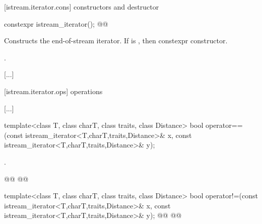 [istream.iterator.cons]{ constructors and destructor}

%
\begin{itemdecl}
constexpr istream_iterator();
@@
\end{itemdecl}

\begin{itemdescr}
\pnum
\effects
Constructs the end-of-stream iterator.
If  is ,
then  constexpr
constructor.

\pnum
\postconditions {}.
\end{itemdescr}

[...]

[istream.iterator.ops]{ operations}

[...]

\setcounter{Paras}{7}
%
\begin{itemdecl}
template<class T, class charT, class traits, class Distance>
  bool operator==(const istream_iterator<T,charT,traits,Distance>& x,
                  const istream_iterator<T,charT,traits,Distance>& y);
\end{itemdecl}

\begin{itemdescr}
\pnum
\returns
{}.
\end{itemdescr}

\begin{addedblock}
{\color{newclr}
%
\begin{itemdecl}
@@
@@
\end{itemdecl}

\begin{itemdescr}
\pnum
\newtxt{\returns
}
\end{itemdescr}
} %
\end{addedblock}

%
\begin{itemdecl}
template<class T, class charT, class traits, class Distance>
  bool operator!=(const istream_iterator<T,charT,traits,Distance>& x,
                  const istream_iterator<T,charT,traits,Distance>& y);
@@
@@
\end{itemdecl}

